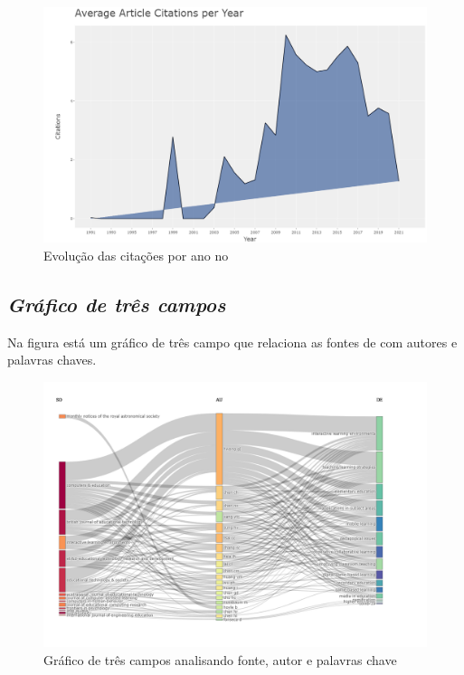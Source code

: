 \begin{figure}[ht]
    \centering
    \includegraphics[width=12cm]{experiments/MarcusABR/PesquisaBibliometrica/Imagens/newplot(1).png}
    \caption{Evolução das citações por ano no \dataset\ }
    \label{fig:eddi-citation-year}
\end{figure}

\subsection{\textit{Gráfico de três campos}}

Na figura está um gráfico de três campo que relaciona as fontes de com autores e palavras chaves.

\begin{figure}[ht]
    \centering
    \includegraphics[width=12cm]{experiments/MarcusABR/PesquisaBibliometrica/Imagens/newplot(3).png}
    \caption{Gráfico de três campos analisando fonte, autor e palavras chave}
    \label{fig:eddi-three-field}
\end{figure}

